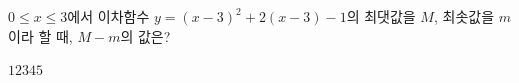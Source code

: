 $0\le x\le 3$에서 이차함수 $y=(x-3)^2+2(x-3)-1$의 최댓값을 $M$, 최솟값을 $m$이라 할 때, $M-m$의 값은?
\begin{choices32}{$1$}{$2$}{$3$}{$4$}{$5$}\end{choices32}
